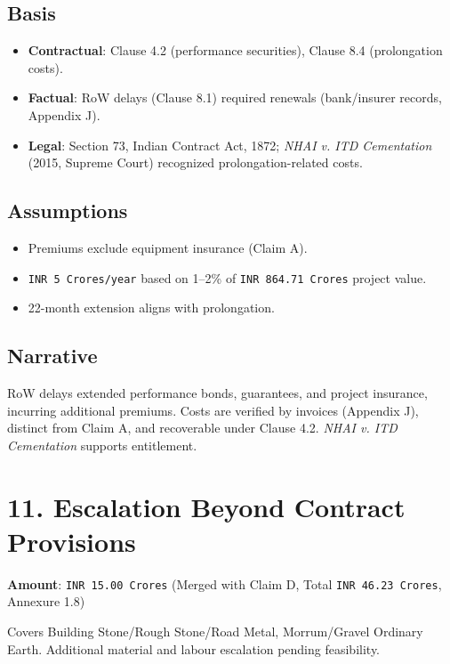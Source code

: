\documentclass[12pt,letterpaper]{article}
\begin{document}
	\subsection*{Basis}
	\begin{itemize}
		\item \textbf{Contractual}: Clause 4.2 (performance securities), Clause 8.4 (prolongation costs).
		\item \textbf{Factual}: RoW delays (Clause 8.1) required renewals (bank/insurer records, Appendix J).
		\item \textbf{Legal}: Section 73, Indian Contract Act, 1872; \textit{NHAI v. ITD Cementation} (2015, Supreme Court) recognized prolongation-related costs.
	\end{itemize}
	
	\subsection*{Assumptions}
	\begin{itemize}
		\item Premiums exclude equipment insurance (Claim A).
		\item \texttt{INR 5 Crores/year} based on 1--2\% of \texttt{INR 864.71 Crores} project value.
		\item 22-month extension aligns with prolongation.
	\end{itemize}
	
	\subsection*{Narrative}
	RoW delays extended performance bonds, guarantees, and project insurance, incurring additional premiums. Costs are verified by invoices (Appendix J), distinct from Claim A, and recoverable under Clause 4.2. \textit{NHAI v. ITD Cementation} supports entitlement.
	
	\section*{11. Escalation Beyond Contract Provisions}
	\textbf{Amount}: \texttt{INR 15.00 Crores} (Merged with Claim D, Total \texttt{INR 46.23 Crores}, Annexure 1.8)
	
	Covers Building Stone/Rough Stone/Road Metal, Morrum/Gravel Ordinary Earth. Additional material and labour escalation pending feasibility.
	
\end{document}
